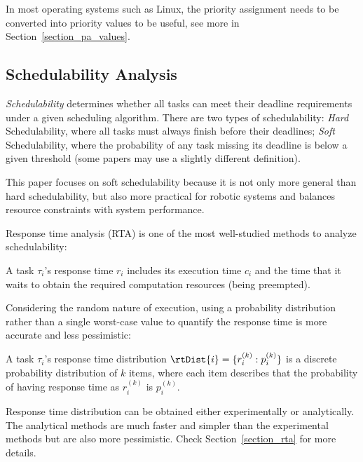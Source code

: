     In most operating systems such as Linux, the priority assignment needs to be converted into priority values to be useful, see more in Section~\ref{section_pa_values}.
	
	\subsection{Schedulability Analysis}
	\label{sectino_schedulability_analysis}

    \textit{Schedulability} determines whether all tasks can meet their deadline requirements under a given scheduling algorithm.
    There are two types of schedulability: \textit{Hard} Schedulability, where all tasks must always finish before their deadlines;
    \textit{Soft} Schedulability, where the probability of any task missing its deadline is below a given threshold (some papers may use a slightly different definition).
    
	This paper focuses on soft schedulability because it is not only more general than hard schedulability, but also more practical for robotic systems and balances resource constraints with system performance.
    
	
	Response time analysis (RTA) is one of the most well-studied methods to analyze schedulability:
	\begin{definition}
		A task $\tau_i$'s response time $r_i$ includes its execution time $c_i$ and the time that it waits to obtain the required computation resources (\eg being preempted).
	\end{definition}
	Considering the random nature of execution, using a probability distribution rather than a single worst-case value to quantify the response time is more accurate and less pessimistic:
	\begin{definition}
		A task $\tau_i$'s response time distribution $\rtDist{i} = \{r_i^{(k)}: p_i^{(k)}\}$ is a discrete probability distribution of $k$ items, where each item describes that the probability of having response time as $r_i^{(k)}$ is $p_i^{(k)}$.
	\end{definition}
    
	Response time distribution can be obtained either experimentally or analytically. 
	The analytical methods are much faster and simpler than the experimental methods but are also more pessimistic. 
	Check Section~\ref{section_rta} for more details.
	
	